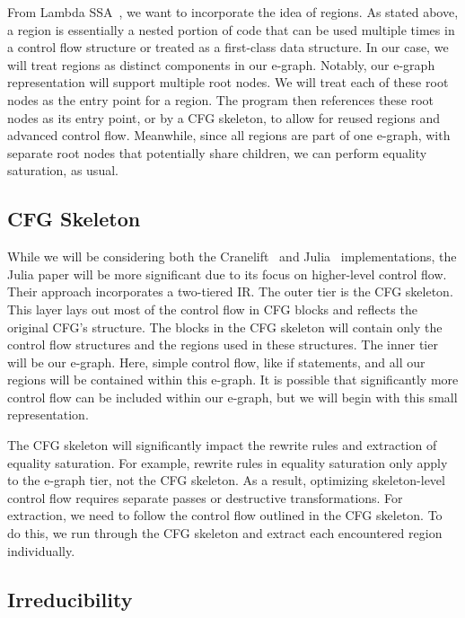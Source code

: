 \documentclass{article}
\begin{document}
From Lambda SSA~\cite{bhat2022lambdaultimatessaoptimizing}, we want to incorporate the idea of regions. As stated above, a region is essentially a nested portion of code that can be used multiple times in a control flow structure or treated as a first-class data structure. In our case, we will treat regions as distinct components in our e-graph. Notably, our e-graph representation will support multiple root nodes. We will treat each of these root nodes as the entry point for a region. The program then references these root nodes as its entry point, or by a CFG skeleton, to allow for reused regions and advanced control flow. Meanwhile, since all regions are part of one e-graph, with separate root nodes that potentially share children, we can perform equality saturation, as usual.


\subsection{CFG Skeleton}

While we will be considering both the Cranelift~\cite{bytecodealliance_2025} and Julia~\cite{merckx2025equalitysaturationoptimizinghighlevel} implementations, the Julia paper will be more significant due to its focus on higher-level control flow. Their approach incorporates a two-tiered IR. The outer tier is the CFG skeleton. This layer lays out most of the control flow in CFG blocks and reflects the original CFG's structure. The blocks in the CFG skeleton will contain only the control flow structures and the regions used in these structures. The inner tier will be our e-graph. Here, simple control flow, like if statements, and all our regions will be contained within this e-graph. It is possible that significantly more control flow can be included within our e-graph, but we will begin with this small representation.

The CFG skeleton will significantly impact the rewrite rules and extraction of equality saturation. For example, rewrite rules in equality saturation only apply to the e-graph tier, not the CFG skeleton. As a result, optimizing skeleton-level control flow requires separate passes or destructive transformations. For extraction, we need to follow the control flow outlined in the CFG skeleton. To do this, we run through the CFG skeleton and extract each encountered region individually.


\subsection{Irreducibility}
\end{document}
